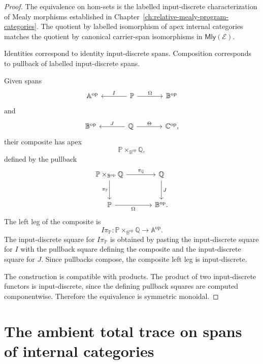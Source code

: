 \begin{proof}
The equivalence on hom-sets is the labelled input-discrete characterization of
Mealy morphisms established in
Chapter~\ref{ch:relative-mealy-program-categories}.  The quotient by labelled
isomorphism of apex internal categories matches the quotient by canonical
carrier-span isomorphisms in \(\mathsf{Mly}(\mathcal E)\).

Identities correspond to identity input-discrete spans.  Composition
corresponds to pullback of labelled input-discrete spans.

Given spans
\[
\begin{tikzcd}[column sep=large]
\mathbb A^{\mathrm{op}}
&
\mathbb P
  \arrow[l, "I"']
  \arrow[r, "\Omega"]
&
\mathbb B^{\mathrm{op}}
\end{tikzcd}
\]
and
\[
\begin{tikzcd}[column sep=large]
\mathbb B^{\mathrm{op}}
&
\mathbb Q
  \arrow[l, "J"']
  \arrow[r, "\Theta"]
&
\mathbb C^{\mathrm{op}},
\end{tikzcd}
\]
their composite has apex
\[
\mathbb P\times_{\mathbb B^{\mathrm{op}}}\mathbb Q,
\]
defined by the pullback
\[
\begin{tikzcd}[column sep=large,row sep=large]
\mathbb P\times_{\mathbb B^{\mathrm{op}}}\mathbb Q
  \arrow[r, "\pi_{\mathbb Q}"]
  \arrow[d, "\pi_{\mathbb P}"']
&
\mathbb Q
  \arrow[d, "J"]
\\
\mathbb P
  \arrow[r, "\Omega"']
&
\mathbb B^{\mathrm{op}} .
\end{tikzcd}
\]
The left leg of the composite is
\[
I\pi_{\mathbb P}:
\mathbb P\times_{\mathbb B^{\mathrm{op}}}\mathbb Q
\longrightarrow
\mathbb A^{\mathrm{op}}.
\]
The input-discrete square for \(I\pi_{\mathbb P}\) is obtained by pasting the
input-discrete square for \(I\) with the pullback square defining the composite
and the input-discrete square for \(J\).  Since pullbacks compose, the
composite left leg is input-discrete.

The construction is compatible with products.  The product of two
input-discrete functors is input-discrete, since the defining pullback squares
are computed componentwise.  Therefore the equivalence is symmetric monoidal.
\end{proof}

\section{The ambient total trace on spans of internal categories}
\label{sec:ambient-total-trace-spans-internal-categories}

